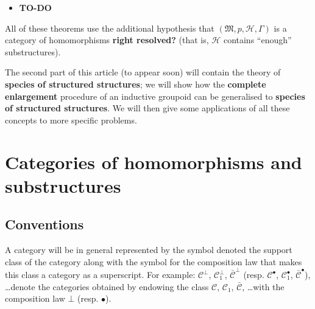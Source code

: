 \documentclass{article}
\newcommand{\todo}{{\color{purple}\textbf{TO-DO }}}
\newcommand{\unsure}[1]{{\color{purple}\textbf{#1}}}
\newcommand{\CC}{\mathcal{C}}
\newcommand{\HH}{\mathcal{H}}
\newcommand{\MM}{\mathfrak{M}}
\newcommand{\dotc}{{\mathbin{\bullet}}}
\newcommand{\botc}{{\mathbin{\bot}}}
\begin{document}
\begin{itemize}
  \item \todo
\end{itemize}

All of these theorems use the additional hypothesis that $(\MM,p,\HH,\Gamma)$ is a category of homomorphisms \unsure{right resolved?} (that is, $\HH$ contains ``enough'' substructures).

The second part of this article (to appear soon) will contain the theory of \unsure{species of structured structures};
we will show how the \unsure{complete enlargement} procedure of an inductive groupoid can be generalised to \unsure{species of structured structures}.
We will then give some applications of all these concepts to more specific problems.



\section{Categories of homomorphisms and substructures}

\subsection{Conventions}

A category will be in general represented by the symbol denoted the support class of the category along with the symbol for the composition law that makes this class a category as a superscript.
For example: $\CC^\botc$, $\CC_1^\botc$, $\bar{\CC}^\botc$ (resp. $\CC^\dotc$, $\CC_1^\dotc$, $\bar{\CC}^\dotc$), \ldots denote the categories obtained by endowing the class $\CC$, $\CC_1$, $\bar{\CC}$, \ldots with the composition law $\botc$ (resp. $\dotc$).







\nocite{*}
\printbibliography[heading=bibintoc,title=Bibliography]
\end{document}

